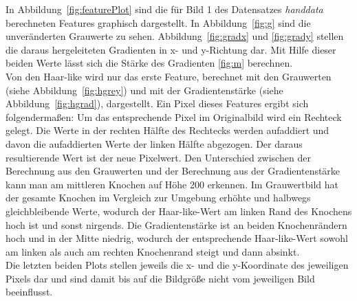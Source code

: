 \documentclass[]{report}
\begin{document}
\begin{enumerate}
					In Abbildung~\ref{fig:featurePlot} sind die für Bild 1 des Datensatzes \textit{handdata} berechneten Features graphisch dargestellt. In Abbildung~\ref{fig:g} sind die unveränderten Grauwerte zu sehen. Abbildung~\ref{fig:gradx} und \ref{fig:grady} stellen die daraus hergeleiteten Gradienten in x- und y-Richtung dar. Mit Hilfe dieser beiden Werte lässt sich die Stärke des Gradienten \ref{fig:m} berechnen. \\
					Von den Haar-like wird nur das erste Feature, berechnet mit den Grauwerten (siehe Abbildung~\ref{fig:hgrey}) und mit der Gradientenstärke (siehe Abbildung~\ref{fig:hgrad}), dargestellt.
					Ein Pixel dieses Features ergibt sich folgendermaßen: Um das entsprechende Pixel im Originalbild wird ein Rechteck gelegt. Die Werte in der rechten Hälfte des Rechtecks werden aufaddiert und davon die aufaddierten Werte der linken Hälfte abgezogen. Der daraus resultierende Wert ist der neue Pixelwert. Den Unterschied zwischen der Berechnung aus den Grauwerten und der Berechnung aus der Gradientenstärke kann man am mittleren Knochen auf Höhe 200 erkennen. Im Grauwertbild hat der gesamte Knochen im Vergleich zur Umgebung erhöhte und halbwegs gleichbleibende Werte, wodurch der Haar-like-Wert am linken Rand des Knochens hoch ist und sonst nirgends. Die Gradientenstärke ist an beiden Knochenrändern hoch und in der Mitte niedrig, wodurch der entsprechende Haar-like-Wert sowohl am linken als auch am rechten Knochenrand steigt und dann absinkt.
					\\
					Die letzten beiden Plots stellen jeweils die x- und die y-Koordinate des jeweiligen Pixels dar und sind damit bis auf die Bildgröße nicht vom jeweiligen Bild beeinflusst.
						

\end{enumerate}
\end{document}
